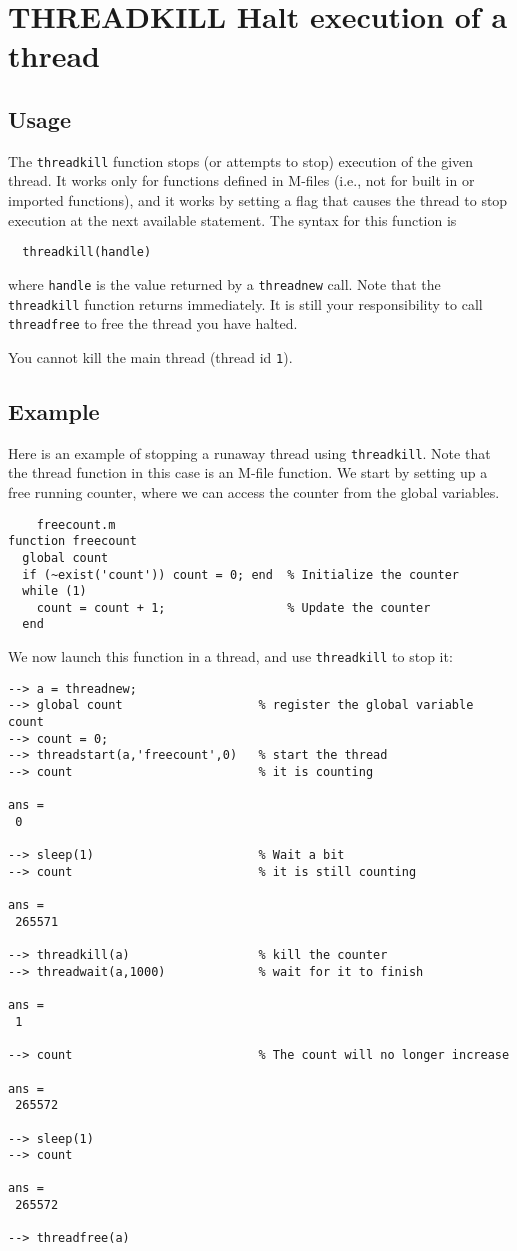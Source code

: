 \section{THREADKILL Halt execution of a thread}

\subsection{Usage}

The \verb|threadkill| function stops (or attempts to stop) execution
of the given thread.  It works only for functions defined in M-files
(i.e., not for built in or imported functions), and it works by 
setting a flag that causes the thread to stop execution at the next
available statement.  The syntax for this function is 
\begin{verbatim}
  threadkill(handle)
\end{verbatim}
where \verb|handle| is the value returned by a \verb|threadnew| call.  
Note that the \verb|threadkill| function returns immediately.  It 
is still your responsibility to call \verb|threadfree| to free
the thread you have halted.

You cannot kill the main thread (thread id \verb|1|).
\subsection{Example}

Here is an example of stopping a runaway thread using \verb|threadkill|.
Note that the thread function in this case is an M-file function.
We start by setting up a free running counter, where we can access 
the counter from the global variables.  
\begin{verbatim}
    freecount.m
function freecount
  global count
  if (~exist('count')) count = 0; end  % Initialize the counter
  while (1)
    count = count + 1;                 % Update the counter
  end
\end{verbatim}
We now launch this function in a thread, and use \verb|threadkill| to
stop it:
\begin{verbatim}
--> a = threadnew;
--> global count                   % register the global variable count
--> count = 0;
--> threadstart(a,'freecount',0)   % start the thread
--> count                          % it is counting

ans = 
 0 

--> sleep(1)                       % Wait a bit
--> count                          % it is still counting

ans = 
 265571 

--> threadkill(a)                  % kill the counter
--> threadwait(a,1000)             % wait for it to finish

ans = 
 1 

--> count                          % The count will no longer increase

ans = 
 265572 

--> sleep(1)
--> count

ans = 
 265572 

--> threadfree(a)
\end{verbatim}
